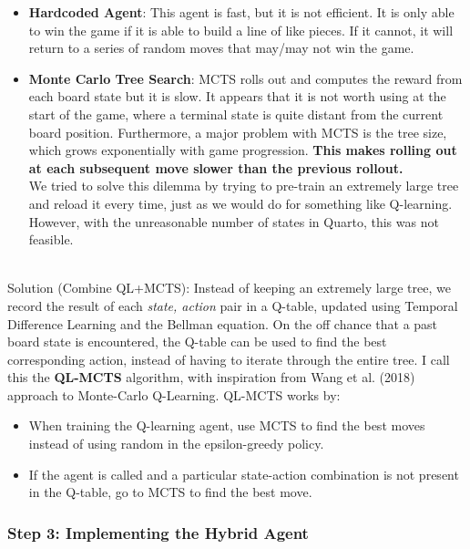 \begin{itemize}
    \item \textbf{Hardcoded Agent}: This agent is fast, but it is not efficient. It is only able to win the game if it is able to build a line of like pieces. If it cannot, it will return to a series of random moves that may/may not win the game.
    \item \textbf{Monte Carlo Tree Search}: MCTS rolls out and computes the reward from each board state but it is slow. It appears that it is not worth using at the start of the game, where a terminal state is quite distant from the current board position. Furthermore, a major problem with MCTS is the tree size, which grows exponentially with game progression. \textbf{This makes rolling out at each subsequent move slower than the previous rollout.} \\ We tried to solve this dilemma by trying to pre-train an extremely large tree and reload it every time, just as we would do for something like Q-learning. However, with the unreasonable number of states in Quarto, this was not feasible. \\ \\
\end{itemize}

Solution (Combine QL+MCTS): Instead of keeping an extremely large tree, we record the result of each \textit{state, action} pair in a Q-table, updated using Temporal Difference Learning and the Bellman equation. On the off chance that a past board state is encountered, the Q-table can be used to find the best corresponding action, instead of having to iterate through the entire tree. I call this the \textbf{QL-MCTS} algorithm, with inspiration from Wang et al. (2018) approach to Monte-Carlo Q-Learning. QL-MCTS works by:

\begin{itemize}
    \item When training the Q-learning agent, use MCTS to find the best moves instead of using random in the epsilon-greedy policy.
    \item If the agent is called and a particular state-action combination is not present in the Q-table, go to MCTS to find the best move.
\end{itemize}

\subsubsection{Step 3: Implementing the Hybrid Agent}


